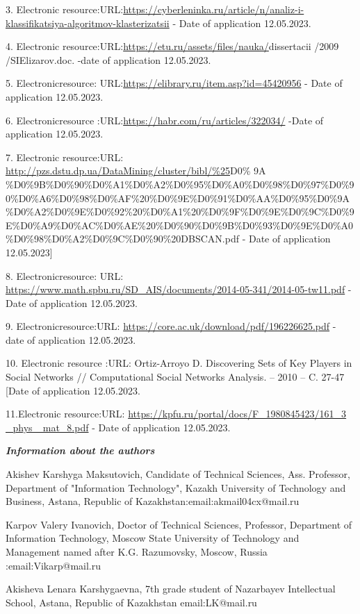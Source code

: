 3. Electronic
resource:URL:\url{https://cyberleninka.ru/article/n/analiz-i-klassifikatsiya-algoritmov-klasterizatsii}
- Date of application 12.05.2023.

4. Electronic
resource:URL:\url{https://etu.ru/assets/files/nauka/}dissertacii /2009
/SIElizarov.doc. -date of application 12.05.2023.

5. Electronicresource:
URL:\url{https://elibrary.ru/item.asp?id=45420956} - Date of application
12.05.2023.

6. Electronicresource :URL:\url{https://habr.com/ru/articles/322034/}
-Date of application 12.05.2023.

7. Electronic resource:URL:
\url{http://pzs.dstu.dp.ua/DataMining/cluster/bibl/\%25}D0\% 9A
\%D0\%9B\%D0\%90\%D0\%A1\%D0\%A2\%D0\%95\%D0\%A0\%D0\%98\%D0\%97\%D0\%90\%D0\%A6\%D0\%98\%D0\%AF\%20\%D0\%9E\%D0\%91\%D0\%AA\%D0\%95\%D0\%9A\%D0\%A2\%D0\%9E\%D0\%92\%20\%D0\%A1\%20\%D0\%9F\%D0\%9E\%D0\%9C\%D0\%9E\%D0\%A9\%D0\%AC\%D0\%AE\%20\%D0\%90\%D0\%9B\%D0\%93\%D0\%9E\%D0\%A0\%D0\%98\%D0\%A2\%D0\%9C\%D0\%90\%20DBSCAN.pdf
- Date of application 12.05.2023{]}

8. Electronicresource: URL:
\url{https://www.math.spbu.ru/SD_AIS/documents/2014-05-341/2014-05-tw11.pdf}
-Date of application 12.05.2023.

9. Electronicresource:URL:
\url{https://core.ac.uk/download/pdf/196226625.pdf} - date of
application 12.05.2023.

10. Electronic resource :URL: Ortiz-Arroyo D. Discovering Sets of Key
Players in Social Networks // Computational Social Networks Analysis. --
2010 -- C. 27-47 {[}Date of application 12.05.2023.

11.Electronic resource:URL:
\href{https://kpfu.ru/portal/docs/F_1980845423/161_3\%20_phys\%20_mat_8.pdf}{https://kpfu.ru/portal/docs/F\_1980845423/161\_3
\_phys \_mat\_8.pdf} - Date of application 12.05.2023.

\emph{{\bfseries Information about the authors}}

Akishev Karshyga Maksutovich, Candidate of Technical Sciences, Ass.
Professor, Department of "Information Technology", Kazakh University of
Technology and Business, Astana, Republic of
Kazakhstan:email:akmail04cx@mail.ru

Karpov Valery Ivanovich, Doctor of Technical Sciences, Professor,
Department of Information Technology, Moscow State University of
Technology and Management named after K.G. Razumovsky, Moscow, Russia
:email:Vikarp@mail.ru

Akisheva Lenara Karshygaevna, 7th grade student of Nazarbayev
Intellectual School, Astana, Republic of Kazakhstan email:LK@mail.ru

